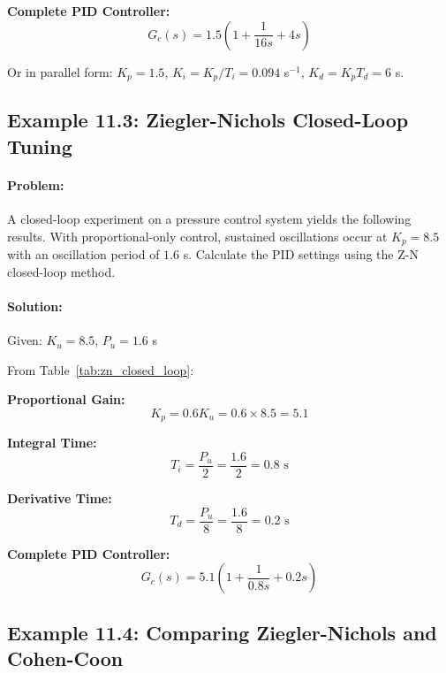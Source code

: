 \textbf{Complete PID Controller:}
\begin{equation}
    G_c(s) = 1.5\left(1 + \frac{1}{16s} + 4s\right)
\end{equation}

Or in parallel form: $K_p = 1.5$, $K_i = K_p/T_i = 0.094$ s$^{-1}$, $K_d = K_p T_d = 6$ s.

\hrulefill

\subsection{Example 11.3: Ziegler-Nichols Closed-Loop Tuning}

\paragraph{Problem:} A closed-loop experiment on a pressure control system yields the following results. With proportional-only control, sustained oscillations occur at $K_p = 8.5$ with an oscillation period of $1.6$ s. Calculate the PID settings using the Z-N closed-loop method.

\paragraph{Solution:}

Given: $K_u = 8.5$, $P_u = 1.6$ s

From Table~\ref{tab:zn_closed_loop}:

\textbf{Proportional Gain:}
\begin{equation}
    K_p = 0.6 K_u = 0.6 \times 8.5 = 5.1
\end{equation}

\textbf{Integral Time:}
\begin{equation}
    T_i = \frac{P_u}{2} = \frac{1.6}{2} = 0.8 \text{ s}
\end{equation}

\textbf{Derivative Time:}
\begin{equation}
    T_d = \frac{P_u}{8} = \frac{1.6}{8} = 0.2 \text{ s}
\end{equation}

\textbf{Complete PID Controller:}
\begin{equation}
    G_c(s) = 5.1\left(1 + \frac{1}{0.8s} + 0.2s\right)
\end{equation}

\hrulefill

\subsection{Example 11.4: Comparing Ziegler-Nichols and Cohen-Coon}

